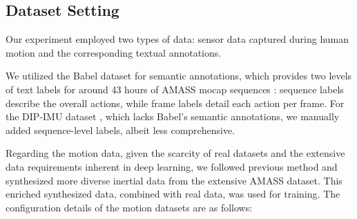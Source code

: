 \documentclass[letterpaper]{article} %
\begin{document}
\subsection{Dataset Setting}
Our experiment employed two types of data: sensor data captured during human motion and the corresponding textual annotations.

We utilized the Babel dataset \cite{BABEL:CVPR:2021} for semantic annotations, which provides two levels of text labels for around 43 hours of AMASS mocap sequences \cite{mahmood2019amass}: sequence labels describe the overall actions, while frame labels detail each action per frame. For the DIP-IMU dataset \cite{huang2018deep}, which lacks Babel's semantic annotations, we manually added sequence-level labels, albeit less comprehensive.

Regarding the motion data, given the scarcity of real datasets and the extensive data requirements inherent in deep learning, we followed previous method \cite{jiang2022transformer} and synthesized more diverse inertial data from the extensive AMASS dataset. This enriched synthesized data, combined with real data, was used for training. The configuration details of the motion datasets are as follows:
\end{document}

